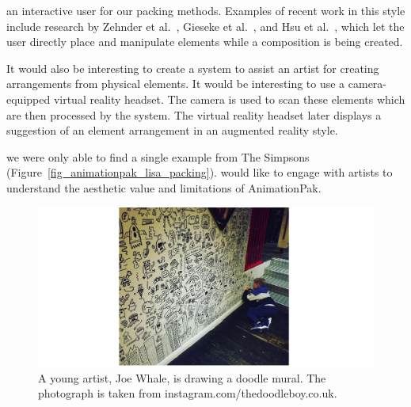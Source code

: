  an interactive user  for our packing methods.
Examples of recent work in this style include research
by Zehnder et al.~\cite{Zehnder2016}, Gieseke et al.~\cite{Gieseke2017}, 
and Hsu et al.~\cite{Hsu2020}, which let the user directly place and manipulate
elements while a composition is being created.

\nnewtext
{
It would also be interesting to create a system to assist an artist for creating arrangements from physical elements.
It would be interesting to use a camera-equipped virtual reality headset. The camera is used to scan these elements which are then processed by the system.
The virtual reality headset later displays a suggestion of an element arrangement in an augmented reality style.
}

we were only able to find a single example from The Simpsons (Figure~\ref{fig_animationpak_lisa_packing}). 
 would like to engage with artists to understand the aesthetic value and limitations
of AnimationPak.

\begin{figure}
\centering
\includegraphics[width=1.0\textwidth]{figures/conclusions/doodle_boy.pdf}
\caption[A doodle mural by Joe Whale]
{ \label{doodle_boy} 
\newtext
{
A young artist, Joe Whale, is drawing a doodle mural. 
The photograph is taken from instagram.com/thedoodleboy.co.uk.
}
}
\end{figure}

